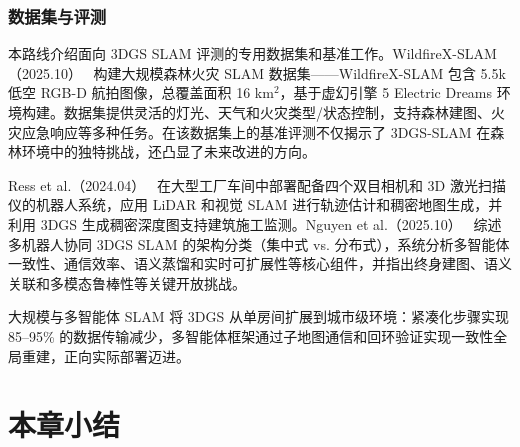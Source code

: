 \subsubsection{数据集与评测}

本路线介绍面向 3DGS SLAM 评测的专用数据集和基准工作。WildfireX-SLAM（2025.10）~\cite{2510_27133} 构建大规模森林火灾 SLAM 数据集——WildfireX-SLAM 包含 5.5k 低空 RGB-D 航拍图像，总覆盖面积 16 km$^2$，基于虚幻引擎 5 Electric Dreams 环境构建。数据集提供灵活的灯光、天气和火灾类型/状态控制，支持森林建图、火灾应急响应等多种任务。在该数据集上的基准评测不仅揭示了 3DGS-SLAM 在森林环境中的独特挑战，还凸显了未来改进的方向。

Ress et al.（2024.04）~\cite{2404_17215} 在大型工厂车间中部署配备四个双目相机和 3D 激光扫描仪的机器人系统，应用 LiDAR 和视觉 SLAM 进行轨迹估计和稠密地图生成，并利用 3DGS 生成稠密深度图支持建筑施工监测。Nguyen et al.（2025.10）~\cite{2510_23988} 综述多机器人协同 3DGS SLAM 的架构分类（集中式 vs. 分布式），系统分析多智能体一致性、通信效率、语义蒸馏和实时可扩展性等核心组件，并指出终身建图、语义关联和多模态鲁棒性等关键开放挑战。

\begin{takeaway}
大规模与多智能体 SLAM 将 3DGS 从单房间扩展到城市级环境：紧凑化步骤实现 85--95\% 的数据传输减少，多智能体框架通过子地图通信和回环验证实现一致性全局重建，正向实际部署迈进。
\end{takeaway}




\section*{本章小结}

